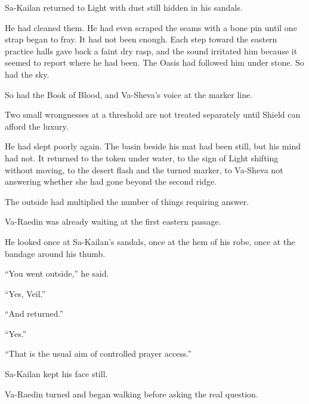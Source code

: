 
\noindent Sa-Kailan returned to Light with dust still hidden in his sandals.\par

He had cleaned them.
He had even scraped the seams with a bone pin until one strap began to fray.
It had not been enough.
Each step toward the eastern practice halls gave back a faint dry rasp, and the sound irritated him because it seemed to report where he had been.
The Oasis had followed him under stone.
So had the sky.\par

So had the Book of Blood, and Va-Sheva’s voice at the marker line.\par

Two small wrongnesses at a threshold are not treated separately until Shield can afford the luxury.\par

He had slept poorly again.
The basin beside his mat had been still, but his mind had not.
It returned to the token under water, to the sign of Light shifting without moving, to the desert flash and the turned marker, to Va-Sheva not answering whether she had gone beyond the second ridge.\par

The outside had multiplied the number of things requiring answer.\par

Va-Raedin was already waiting at the first eastern passage.\par

He looked once at Sa-Kailan’s sandals, once at the hem of his robe, once at the bandage around his thumb.\par

“You went outside,” he said.\par

“Yes, Veil.”\par

“And returned.”\par

“Yes.”\par

“That is the usual aim of controlled prayer access.”\par

Sa-Kailan kept his face still.\par

Va-Raedin turned and began walking before asking the real question.\par

